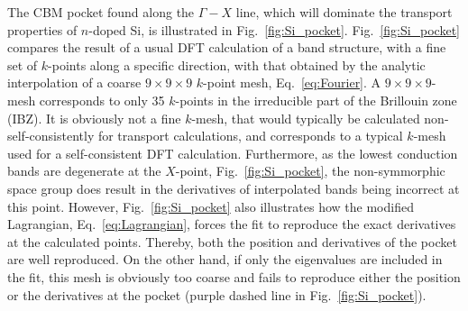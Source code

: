 \documentclass[final,5p,times,twocolumn,sort&compress]{elsarticle}
\begin{document}
The CBM pocket found along the $\Gamma-X$ line, which will dominate the transport properties of $n$-doped Si, is illustrated in Fig.~\ref{fig:Si_pocket}. Fig.~\ref{fig:Si_pocket} compares the result of a usual DFT calculation of a band structure, with a fine set of $k$-points along a specific direction, with that obtained by the analytic interpolation of a coarse $9\times9\times9$ $k$-point mesh, Eq.~\eqref{eq:Fourier}. A  $9\times9\times9$-mesh corresponds to only 35 $k$-points in the irreducible part of the Brillouin zone (IBZ). It is obviously not a fine $k$-mesh, that would typically be calculated non-self-consistently for transport calculations\cite{Madsen_JACS06}, and corresponds to a typical $k$-mesh used for a self-consistent DFT calculation. Furthermore, as the lowest conduction bands are degenerate at the $X$-point, Fig.~\ref{fig:Si_pocket}, the non-symmorphic space group does result in the derivatives of interpolated bands being incorrect at this point. However, Fig.~\ref{fig:Si_pocket} also illustrates how the modified Lagrangian, Eq.~\eqref{eq:Lagrangian}, forces the fit to reproduce the exact derivatives at the calculated points. Thereby, both the position and derivatives of the pocket are well reproduced. On the other hand, if only the eigenvalues are included in the fit, this mesh is obviously too coarse and fails to reproduce either the position or the derivatives at the pocket (purple dashed line in Fig.~\ref{fig:Si_pocket}).
\end{document}
